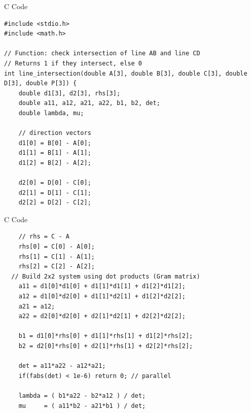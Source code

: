 \documentclass{beamer}
\begin{document}
\begin{frame}[fragile]{C Code}
\begin{lstlisting}
#include <stdio.h>
#include <math.h>

// Function: check intersection of line AB and line CD
// Returns 1 if they intersect, else 0
int line_intersection(double A[3], double B[3], double C[3], double D[3], double P[3]) {
    double d1[3], d2[3], rhs[3];
    double a11, a12, a21, a22, b1, b2, det;
    double lambda, mu;

    // direction vectors
    d1[0] = B[0] - A[0];
    d1[1] = B[1] - A[1];
    d1[2] = B[2] - A[2];

    d2[0] = D[0] - C[0];
    d2[1] = D[1] - C[1];
    d2[2] = D[2] - C[2];
\end{lstlisting}
\end{frame}

\begin{frame}[fragile]{C Code}
\begin{lstlisting}
    // rhs = C - A
    rhs[0] = C[0] - A[0];
    rhs[1] = C[1] - A[1];
    rhs[2] = C[2] - A[2];
  // Build 2x2 system using dot products (Gram matrix)
    a11 = d1[0]*d1[0] + d1[1]*d1[1] + d1[2]*d1[2];
    a12 = d1[0]*d2[0] + d1[1]*d2[1] + d1[2]*d2[2];
    a21 = a12;
    a22 = d2[0]*d2[0] + d2[1]*d2[1] + d2[2]*d2[2];

    b1 = d1[0]*rhs[0] + d1[1]*rhs[1] + d1[2]*rhs[2];
    b2 = d2[0]*rhs[0] + d2[1]*rhs[1] + d2[2]*rhs[2];

    det = a11*a22 - a12*a21;
    if(fabs(det) < 1e-6) return 0; // parallel

    lambda = ( b1*a22 - b2*a12 ) / det;
    mu     = ( a11*b2 - a21*b1 ) / det;

\end{lstlisting}
\end{frame}
\end{document}
